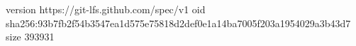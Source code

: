version https://git-lfs.github.com/spec/v1
oid sha256:93b7fb2f54b3547ea1d575e75818d2def0e1a14ba7005f203a1954029a3b43d7
size 393931
